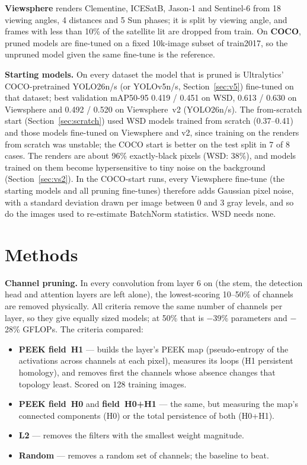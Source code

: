 \documentclass[10pt]{article}
\begin{document}
\textbf{Viewsphere} renders Clementine, ICESatB, Jason-1 and Sentinel-6 from 18 viewing angles,
4 distances and 5 Sun phases; it is split by viewing angle, and frames with less than 10\% of the
satellite lit are dropped from train. On \textbf{COCO}, pruned models are fine-tuned on a fixed
10k-image subset of train2017, so the unpruned model given the same fine-tune is the reference.

\textbf{Starting models.} On every dataset the model that is pruned is Ultralytics' COCO-pretrained
YOLO26n/s (or YOLOv5n/s, Section~\ref{sec:v5}) fine-tuned on that dataset; best validation mAP50-95
0.419 / 0.451 on WSD, 0.613 / 0.630 on Viewsphere and 0.492 / 0.520 on Viewsphere~v2 (YOLO26n/s).
The from-scratch start (Section~\ref{sec:scratch}) used WSD models trained from scratch (0.37--0.41)
and those models fine-tuned on Viewsphere and v2, since training on the renders from scratch was
unstable; the COCO start is better on the test split in 7 of 8 cases. The renders
are about 96\% exactly-black pixels (WSD: 38\%), and models trained on them become hypersensitive to
tiny noise on the background (Section~\ref{sec:vs2}). In the COCO-start runs, every Viewsphere fine-tune
(the starting models and all pruning fine-tunes) therefore adds Gaussian pixel noise, with a standard deviation drawn per
image between 0 and 3 gray levels, and so do the images used to re-estimate BatchNorm statistics.
WSD needs none.

\section{Methods}

\textbf{Channel pruning.} In every convolution from layer 6 on (the stem, the detection head and
attention layers are left alone), the lowest-scoring 10--50\% of channels are removed physically.
All criteria remove the same number of channels per layer, so they give equally sized models; at
50\% that is $-$39\% parameters and $-$28\% GFLOPs. The criteria compared:
\begin{itemize}
\item \textbf{PEEK field~H1} --- builds the layer's PEEK map (pseudo-entropy of the activations
  across channels at each pixel), measures its loops (H1 persistent homology), and removes first the
  channels whose absence changes that topology least. Scored on 128 training images.
\item \textbf{PEEK field~H0} and \textbf{field~H0+H1} --- the same, but measuring the map's
  connected components (H0) or the total persistence of both (H0+H1).
\item \textbf{L2} --- removes the filters with the smallest weight magnitude.
\item \textbf{Random} --- removes a random set of channels; the baseline to beat.
\end{itemize}
\end{document}

